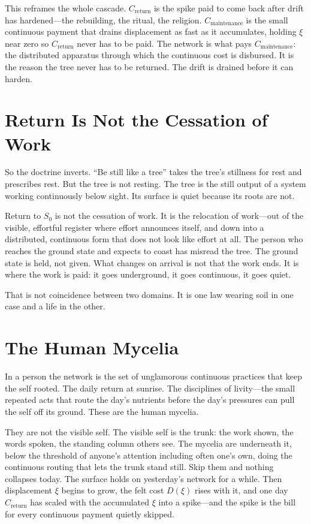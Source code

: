 \documentclass[12pt]{article}
\begin{document}
This reframes the whole cascade. $C_{\text{return}}$ is the spike paid to come back after drift has hardened---the rebuilding, the ritual, the religion. $C_{\text{maintenance}}$ is the small continuous payment that drains displacement as fast as it accumulates, holding $\xi$ near zero so $C_{\text{return}}$ never has to be paid. The network is what pays $C_{\text{maintenance}}$: the distributed apparatus through which the continuous cost is disbursed. It is the reason the tree never has to be returned. The drift is drained before it can harden.

\section{Return Is Not the Cessation of Work}

So the doctrine inverts. ``Be still like a tree'' takes the tree's stillness for rest and prescribes rest. But the tree is not resting. The tree is the still output of a system working continuously below sight. Its surface is quiet because its roots are not.

Return to $S_0$ is not the cessation of work. It is the relocation of work---out of the visible, effortful register where effort announces itself, and down into a distributed, continuous form that does not look like effort at all. The person who reaches the ground state and expects to coast has misread the tree. The ground state is held, not given. What changes on arrival is not that the work ends. It is where the work is paid: it goes underground, it goes continuous, it goes quiet.

That is not coincidence between two domains. It is one law wearing soil in one case and a life in the other.

\section{The Human Mycelia}

In a person the network is the set of unglamorous continuous practices that keep the self rooted. The daily return at sunrise. The disciplines of livity---the small repeated acts that route the day's nutrients before the day's pressures can pull the self off its ground. These are the human mycelia.

They are not the visible self. The visible self is the trunk: the work shown, the words spoken, the standing column others see. The mycelia are underneath it, below the threshold of anyone's attention including often one's own, doing the continuous routing that lets the trunk stand still. Skip them and nothing collapses today. The surface holds on yesterday's network for a while. Then displacement $\xi$ begins to grow, the felt cost $D(\xi)$ rises with it, and one day $C_{\text{return}}$ has scaled with the accumulated $\xi$ into a spike---and the spike is the bill for every continuous payment quietly skipped.
\end{document}
